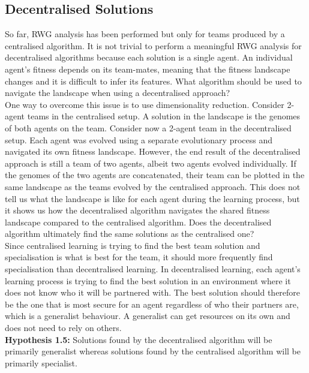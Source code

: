\documentclass[12pt]{article}
\begin{document}
\subsection{Decentralised Solutions} 

So far, RWG analysis has been performed but only for teams produced by a centralised algorithm.
It is not trivial to perform a meaningful RWG analysis for decentralised algorithms because each solution is a single agent.
An individual agent's fitness depends on its team-mates, meaning that the fitness landscape changes and it is difficult to infer its features.
What algorithm should be used to navigate the landscape when using a decentralised approach?\\

One way to overcome this issue is to use dimensionality reduction.
Consider 2-agent teams in the centralised setup.
A solution in the landscape is the genomes of both agents on the team.
Consider now a 2-agent team in the decentralised setup.
Each agent was evolved using a separate evolutionary process and navigated its own fitness landscape.
However, the end result of the decentralised approach is still a team of two agents, albeit two agents evolved individually.
If the genomes of the two agents are concatenated, their team can be plotted in the same landscape as the teams evolved by the centralised approach.
This does not tell us what the landscape is like for each agent during the learning process, but it shows us how the decentralised algorithm navigates the shared fitness landscape compared to the centralised algorithm.
Does the decentralised algorithm ultimately find the same solutions as the centralised one?\\

Since centralised learning is trying to find the best team solution and specialisation is what is best for the team, it should more frequently find specialisation than decentralised learning. 
In decentralised learning, each agent's learning process is trying to find the best solution in an environment where it does not know who it will be partnered with. 
The best solution should therefore be the one that is most secure for an agent regardless of who their partners are, which is a generalist behaviour.
A generalist can get resources on its own and does not need to rely on others.\\

\textbf{Hypothesis 1.5:} Solutions found by the decentralised algorithm will be primarily generalist whereas solutions found by the centralised algorithm will be primarily specialist.\\
\end{document}
